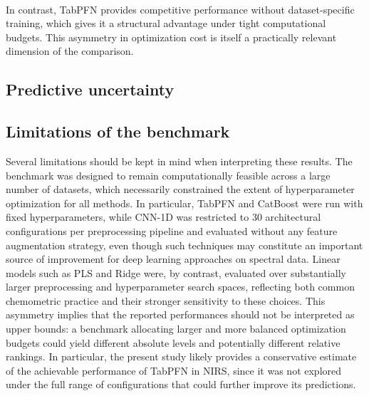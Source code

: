 \documentclass{article}
\begin{document}
~

In contrast, TabPFN provides competitive performance without dataset-specific training, which gives it a structural advantage under tight computational budgets. This asymmetry in optimization cost is itself a practically relevant dimension of the comparison.

\subsection{Predictive uncertainty}


\subsection{Limitations of the benchmark}

Several limitations should be kept in mind when interpreting these results. The benchmark was designed to remain computationally feasible across a large number of datasets, which necessarily constrained the extent of hyperparameter optimization for all methods. In particular, TabPFN and CatBoost were run with fixed hyperparameters, while CNN-1D was restricted to 30 architectural configurations per preprocessing pipeline and evaluated without any feature augmentation strategy, even though such techniques may constitute an important source of improvement for deep learning approaches on spectral data. Linear models such as PLS and Ridge were, by contrast, evaluated over substantially larger preprocessing and hyperparameter search spaces, reflecting both common chemometric practice and their stronger sensitivity to these choices. This asymmetry implies that the reported performances should not be interpreted as upper bounds: a benchmark allocating larger and more balanced optimization budgets could yield different absolute levels and potentially different relative rankings. In particular, the present study likely provides a conservative estimate of the achievable performance of TabPFN in NIRS, since it was not explored under the full range of configurations that could further improve its predictions.
\end{document}
